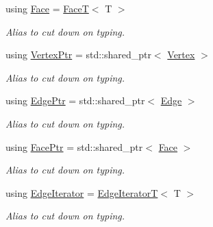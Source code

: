 \begin{DoxyCompactItemize}
using \hyperlink{classDcel_1_1FaceT_a01d61241adc3c536c364084740b8c6da}{Face} = \hyperlink{classDcel_1_1FaceT}{FaceT}$<$ T $>$
\begin{DoxyCompactList}\small\item\em Alias to cut down on typing. \end{DoxyCompactList}\item 
\mbox{\label{classDcel_1_1FaceT_a9c22745bf7351c3bfba27d5816a50deb}} 
using \hyperlink{classDcel_1_1FaceT_a9c22745bf7351c3bfba27d5816a50deb}{Vertex\+Ptr} = std\+::shared\+\_\+ptr$<$ \hyperlink{classDcel_1_1FaceT_acf33f51e5402ed6bf811521b138121b9}{Vertex} $>$
\begin{DoxyCompactList}\small\item\em Alias to cut down on typing. \end{DoxyCompactList}\item 
\mbox{\label{classDcel_1_1FaceT_a0f3448c4cf108341e48029b8040c7cec}} 
using \hyperlink{classDcel_1_1FaceT_a0f3448c4cf108341e48029b8040c7cec}{Edge\+Ptr} = std\+::shared\+\_\+ptr$<$ \hyperlink{classDcel_1_1FaceT_a32a6b328d61bd2739fd840b892833c41}{Edge} $>$
\begin{DoxyCompactList}\small\item\em Alias to cut down on typing. \end{DoxyCompactList}\item 
\mbox{\label{classDcel_1_1FaceT_a4c7f99f7e30983c04a9d0b2f7ca40736}} 
using \hyperlink{classDcel_1_1FaceT_a4c7f99f7e30983c04a9d0b2f7ca40736}{Face\+Ptr} = std\+::shared\+\_\+ptr$<$ \hyperlink{classDcel_1_1FaceT_a01d61241adc3c536c364084740b8c6da}{Face} $>$
\begin{DoxyCompactList}\small\item\em Alias to cut down on typing. \end{DoxyCompactList}\item 
\mbox{\label{classDcel_1_1FaceT_afcd6f529cb59cd3dc358d6da52de54a1}} 
using \hyperlink{classDcel_1_1FaceT_afcd6f529cb59cd3dc358d6da52de54a1}{Edge\+Iterator} = \hyperlink{classDcel_1_1EdgeIteratorT}{Edge\+IteratorT}$<$ T $>$
\begin{DoxyCompactList}\small\item\em Alias to cut down on typing. \end{DoxyCompactList}\end{DoxyCompactItemize}
